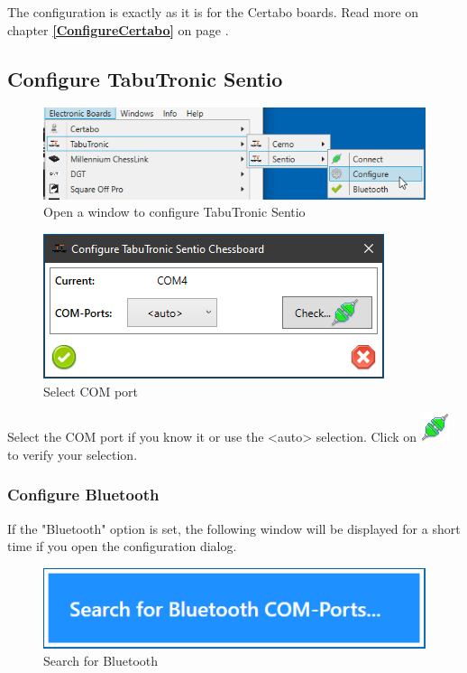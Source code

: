 \documentclass[11pt,a4paper]{article}
\begin{document}
The configuration is exactly as it is for the Certabo boards.
Read more on chapter \textbf{\ref{ConfigureCertabo}  } on page \pageref{ConfigureCertabo}.

\subsection{Configure TabuTronic Sentio} \label{ConfigureTabuTronicSentio}

\begin{figure}[H]
	\centering
	\includegraphics[scale=0.8]{Sentio1.png}
	\caption{Open a window to configure TabuTronic Sentio }
	\label{fig:Sentio1}
\end{figure}


\begin{figure}[H]
	\centering
	\includegraphics[scale=1.0]{Sentio2.png}
	\caption{Select COM port}
	\label{fig:Sentio2}
\end{figure}

Select the COM port if you know it or use the <auto> selection. 
Click on \includegraphics[scale=0.5]{connect.png} to verify your selection.

\subsubsection{Configure Bluetooth} \label{SentioBluetooth}

If the "Bluetooth" option is set, the following window will be displayed for a short time if you open the configuration dialog.

\begin{figure}[H]
	\centering
	\includegraphics[scale=0.8]{MillenniumChessLink10.png}
	\caption{Search for Bluetooth}
	\label{fig:SentioBT10}
\end{figure}
\end{document}
